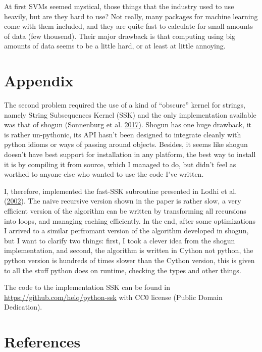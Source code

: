 \documentclass[format=acmtog]{acmart}
\begin{document}
At first SVMs seemed mystical, those things that the industry used to
use heavily, but are they hard to use? Not really, many packages for
machine learning come with them included, and they are quite fast to
calculate for small amounts of data (few thousend). Their major drawback
is that computing using big amounts of data seems to be a little hard,
or at least at little annoying.

\section{Appendix}\label{appendix}

The second problem required the use of a kind of ``obscure'' kernel for
strings, namely String Subsequences Kernel (SSK) and the only
implementation available was that of shogun (Sonnenburg et al.
\protect\hyperlink{ref-shogun_2017}{2017}). Shogun has one huge
drawback, it is rather un-pythonic, its API hasn't been designed to
integrate cleanly with python idioms or ways of passing around objects.
Besides, it seems like shogun doesn't have best support for installation
in any platform, the best way to install it is by compiling it from
source, which I managed to do, but didn't feel as worthed to anyone else
who wanted to use the code I've written.

I, therefore, implemented the fast-SSK subroutine presented in Lodhi et
al. (\protect\hyperlink{ref-lodhi2002text}{2002}). The naive recursive
version shown in the paper is rather slow, a very efficient version of
the algorithm can be written by transforming all recursions into loops,
and managing caching efficiently. In the end, after some optimizations I
arrived to a similar perfromant version of the algorithm developed in
shogun, but I want to clarify two things: first, I took a clever idea
from the shogun implementation, and second, the algorithm is written in
Cython not python, the python version is hundreds of times slower than
the Cython version, this is given to all the stuff python does on
runtime, checking the types and other things.

The code to the implementation SSK can be found in
\url{https://github.com/helq/python-ssk} with CC0 license (Public Domain
Dedication).

\section*{References}
\setlength{\parindent}{-0.2in}
\singlespacing
\small
\setlength{\leftskip}{0.2in}
\setlength{\parskip}{8pt}
\vspace*{-0.4in}
\noindent
\end{document}
